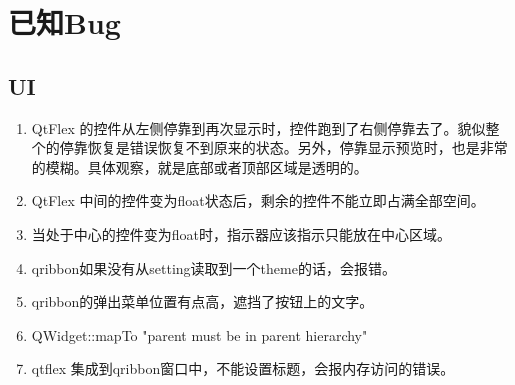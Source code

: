 \section{已知Bug}

\subsection{UI}

\begin{enumerate}
	\item QtFlex 的控件从左侧停靠到再次显示时，控件跑到了右侧停靠去了。貌似整个的停靠恢复是错误恢复不到原来的状态。另外，停靠显示预览时，也是非常的模糊。具体观察，就是底部或者顶部区域是透明的。
	\item QtFlex 中间的控件变为float状态后，剩余的控件不能立即占满全部空间。
	\item 当处于中心的控件变为float时，指示器应该指示只能放在中心区域。
	
	\item qribbon如果没有从setting读取到一个theme的话，会报错。
	
	\item qribbon的弹出菜单位置有点高，遮挡了按钮上的文字。
	
	\item QWidget::mapTo "parent must be in parent hierarchy"
	
	\item qtflex 集成到qribbon窗口中，不能设置标题，会报内存访问的错误。
\end{enumerate}